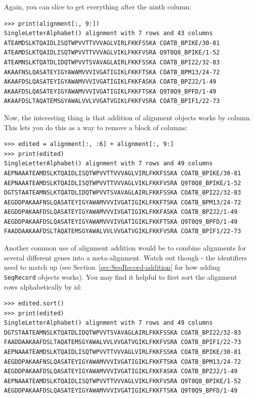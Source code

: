 \documentclass{report}
\begin{document}
\noindent Again, you can slice to get everything after the ninth column:

\begin{verbatim}
>>> print(alignment[:, 9:])
SingleLetterAlphabet() alignment with 7 rows and 43 columns
ATEAMDSLKTQAIDLISQTWPVVTTVVVAGLVIRLFKKFSSKA COATB_BPIKE/30-81
ATEAMDSLKTQAIDLISQTWPVVTTVVVAGLVIKLFKKFVSRA Q9T0Q8_BPIKE/1-52
ATEAMNSLKTQATDLIDQTWPVVTSVAVAGLAIRLFKKFSSKA COATB_BPI22/32-83
AKAAFNSLQASATEYIGYAWAMVVVIVGATIGIKLFKKFTSKA COATB_BPM13/24-72
AKAAFDSLQASATEYIGYAWAMVVVIVGATIGIKLFKKFASKA COATB_BPZJ2/1-49
AKAAFDSLQASATEYIGYAWAMVVVIVGATIGIKLFKKFTSKA Q9T0Q9_BPFD/1-49
AKAAFDSLTAQATEMSGYAWALVVLVVGATVGIKLFKKFVSRA COATB_BPIF1/22-73
\end{verbatim}

\noindent Now, the interesting thing is that addition of alignment objects works
by column. This lets you do this as a way to remove a block of columns:

\begin{verbatim}
>>> edited = alignment[:, :6] + alignment[:, 9:]
>>> print(edited)
SingleLetterAlphabet() alignment with 7 rows and 49 columns
AEPNAAATEAMDSLKTQAIDLISQTWPVVTTVVVAGLVIRLFKKFSSKA COATB_BPIKE/30-81
AEPNAAATEAMDSLKTQAIDLISQTWPVVTTVVVAGLVIKLFKKFVSRA Q9T0Q8_BPIKE/1-52
DGTSTAATEAMNSLKTQATDLIDQTWPVVTSVAVAGLAIRLFKKFSSKA COATB_BPI22/32-83
AEGDDPAKAAFNSLQASATEYIGYAWAMVVVIVGATIGIKLFKKFTSKA COATB_BPM13/24-72
AEGDDPAKAAFDSLQASATEYIGYAWAMVVVIVGATIGIKLFKKFASKA COATB_BPZJ2/1-49
AEGDDPAKAAFDSLQASATEYIGYAWAMVVVIVGATIGIKLFKKFTSKA Q9T0Q9_BPFD/1-49
FAADDAAKAAFDSLTAQATEMSGYAWALVVLVVGATVGIKLFKKFVSRA COATB_BPIF1/22-73
\end{verbatim}

Another common use of alignment addition would be to combine alignments for
several different genes into a meta-alignment. Watch out though - the identifiers
need to match up (see Section~\ref{sec:SeqRecord-addition} for how adding
\verb|SeqRecord| objects works). You may find it helpful to first sort the
alignment rows alphabetically by id:

\begin{verbatim}
>>> edited.sort()
>>> print(edited)
SingleLetterAlphabet() alignment with 7 rows and 49 columns
DGTSTAATEAMNSLKTQATDLIDQTWPVVTSVAVAGLAIRLFKKFSSKA COATB_BPI22/32-83
FAADDAAKAAFDSLTAQATEMSGYAWALVVLVVGATVGIKLFKKFVSRA COATB_BPIF1/22-73
AEPNAAATEAMDSLKTQAIDLISQTWPVVTTVVVAGLVIRLFKKFSSKA COATB_BPIKE/30-81
AEGDDPAKAAFNSLQASATEYIGYAWAMVVVIVGATIGIKLFKKFTSKA COATB_BPM13/24-72
AEGDDPAKAAFDSLQASATEYIGYAWAMVVVIVGATIGIKLFKKFASKA COATB_BPZJ2/1-49
AEPNAAATEAMDSLKTQAIDLISQTWPVVTTVVVAGLVIKLFKKFVSRA Q9T0Q8_BPIKE/1-52
AEGDDPAKAAFDSLQASATEYIGYAWAMVVVIVGATIGIKLFKKFTSKA Q9T0Q9_BPFD/1-49
\end{verbatim}
\end{document}
